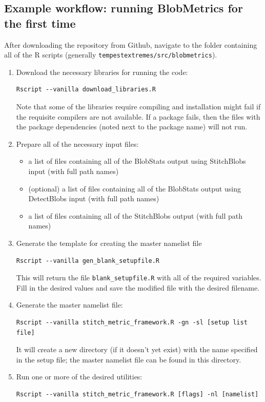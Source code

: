 \documentclass{article}
\begin{document}
\subsection{Example workflow: running BlobMetrics for the first time}

After downloading the repository from Github, navigate to the folder containing all of the R scripts (generally \texttt{tempestextremes/src/blobmetrics}). 
\begin{enumerate}
\item Download the necessary libraries for running the code:
\begin{verbatim}
Rscript --vanilla download_libraries.R
\end{verbatim}

Note that some of the libraries require compiling and installation might fail if the requisite compilers are not available. If a package fails, then the files with the package dependencies (noted next to the package name) will not run. 
\item Prepare all of the necessary input files:
\begin{itemize}
\item a list of files containing all of the BlobStats output using StitchBlobs input (with full path names)
\item (optional) a list of files containing all of the BlobStats output using DetectBlobs input (with full path names)
\item a list of files containing all of the StitchBlobs output (with full path names)
\end{itemize}
\item Generate the template for creating the master namelist file
\begin{verbatim}
Rscript --vanilla gen_blank_setupfile.R
\end{verbatim}

This will return the file \texttt{blank\_setupfile.R} with all of the required variables. Fill in the desired values and save the modified file with the desired filename.
\item Generate the master namelist file:
\begin{verbatim}
Rscript --vanilla stitch_metric_framework.R -gn -sl [setup list file]
\end{verbatim}

It will create a new directory (if it doesn't yet exist) with the name specified in the setup file; the master namelist file can be found in this directory. 
\item Run one or more of the desired utilities:
\begin{verbatim}
Rscript --vanilla stitch_metric_framework.R [flags] -nl [namelist]
\end{verbatim}
\end{enumerate}
\end{document}
